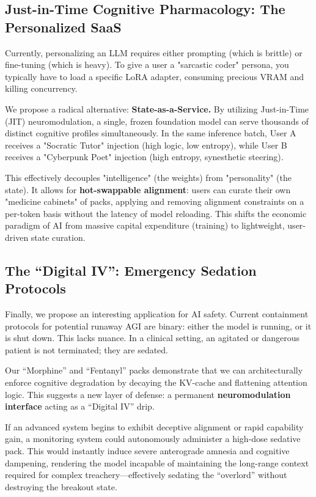 \documentclass[10pt]{article}
\begin{document}
\subsection{Just-in-Time Cognitive Pharmacology: The Personalized SaaS}
Currently, personalizing an LLM requires either prompting (which is brittle) or fine-tuning (which is heavy). To give a user a "sarcastic coder" persona, you typically have to load a specific LoRA adapter, consuming precious VRAM and killing concurrency.

We propose a radical alternative: \textbf{State-as-a-Service.}
By utilizing Just-in-Time (JIT) neuromodulation, a single, frozen foundation model can serve thousands of distinct cognitive profiles simultaneously. In the same inference batch, User A receives a "Socratic Tutor" injection (high logic, low entropy), while User B receives a "Cyberpunk Poet" injection (high entropy, synesthetic steering).

This effectively decouples "intelligence" (the weights) from "personality" (the state). It allows for \textbf{hot-swappable alignment}: users can curate their own "medicine cabinets" of packs, applying and removing alignment constraints on a per-token basis without the latency of model reloading. This shifts the economic paradigm of AI from massive capital expenditure (training) to lightweight, user-driven state curation.

\subsection{The ``Digital IV'': Emergency Sedation Protocols}
Finally, we propose an interesting application for AI safety. Current containment protocols for potential runaway AGI are binary: either the model is running, or it is shut down. This lacks nuance. In a clinical setting, an agitated or dangerous patient is not terminated; they are sedated.

Our ``Morphine'' and ``Fentanyl'' packs demonstrate that we can architecturally enforce cognitive degradation by decaying the KV-cache and flattening attention logic. This suggests a new layer of defense: a permanent \textbf{neuromodulation interface} acting as a ``Digital IV'' drip.

If an advanced system begins to exhibit deceptive alignment or rapid capability gain, a monitoring system could autonomously administer a high-dose sedative pack. This would instantly induce severe anterograde amnesia and cognitive dampening, rendering the model incapable of maintaining the long-range context required for complex treachery---effectively sedating the ``overlord'' without destroying the breakout state.
\end{document}
